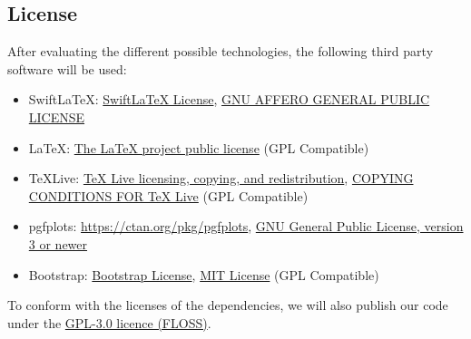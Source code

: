 \subsection{License}\label{subsec:evaluation-license}
After evaluating the different possible technologies, the following third party software will be used:
\begin{itemize}
    \item SwiftLaTeX: \href{https://github.com/SwiftLaTeX/SwiftLaTeX/blob/master/LICENSE}{SwiftLaTeX License}, \href{https://www.gnu.org/licenses/agpl-3.0.en.html}{GNU AFFERO GENERAL PUBLIC LICENSE}
    \item LaTeX: \href{https://www.latex-project.org/lppl.txt}{The LaTeX project public license} (GPL Compatible)
    \item TeXLive: \href{https://www.tug.org/texlive/copying.html}{TeX Live licensing, copying, and redistribution}, \href{https://www.tug.org/texlive/LICENSE.TL}{COPYING CONDITIONS FOR TeX Live} (GPL Compatible)
    \item pgfplots: \href{https://ctan.org/pkg/pgfplots}{https://ctan.org/pkg/pgfplots}, \href{https://www.gnu.org/licenses/gpl-3.0.en.html}{GNU General Public License, version 3 or newer}
    \item Bootstrap: \href{https://github.com/twbs/bootstrap/blob/main/LICENSE}{Bootstrap License}, \href{https://en.wikipedia.org/wiki/MIT_License}{MIT License} (GPL Compatible)
\end{itemize}
To conform with the licenses of the dependencies, we will also publish our code under the \href{https://www.gnu.org/licenses/gpl-3.0.en.html}{GPL-3.0 licence (FLOSS)}.
